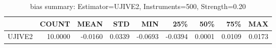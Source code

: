 \begin{table}[ht]
\centering
\caption{bias summary: Estimator=UJIVE2, Instruments=500, Strength=0.20}
\begin{tabular}{lrrrrrrrr}
\toprule
 & COUNT & MEAN & STD & MIN & 25\% & 50\% & 75\% & MAX \\
\midrule
UJIVE2 & 10.0000 & -0.0160 & 0.0339 & -0.0693 & -0.0394 & 0.0001 & 0.0109 & 0.0173 \\
\bottomrule
\end{tabular}
\end{table}
